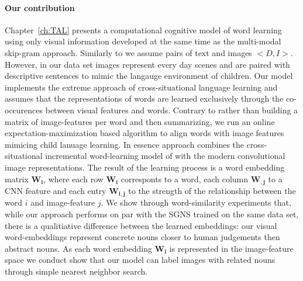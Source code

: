 \paragraph{Our contribution}
Chapter~\ref{ch:TAL} presents a computational cognitive model of word learning using only
visual information developed at the same time as the multi-modal skip-gram approach.
Similarly to \cite{feng2010visual} we assume pairs of text and images
$<D, I>$. However, in our data set images represent every day scenes and are paired with descriptive
sentences to mimic the langauge environment of children.
Our model implements the extreme approach of cross-situational language
learning and assumes that the representations of words are learned exclusively through the co-occurences
between visual features and words. Contrary to \cite{kiela2014learning} rather than building a
matrix of image-features per word and then summarizing, we run an online expectation-maximization based
algorithm to align words with image features mimicing child lanuage learning.
In essence approach combines the cross-situational incremental word-learning model
of \cite{fazly.etal.10csj} with the modern convolutional image representations.
The result of the learning process is a word embedding matrix $\mathbf{W_i}$,
where each row $\mathbf{W_i}$ corresponts to a word, each column $\mathbf{W_{,j}}$
to a CNN feature and each entry $\mathbf{W_{i,j}}$ to the strength
of the relationship between the word $i$ and image-feature $j$.
We show through word-similarity experiments that, while our approach performs on
par with the SGNS trained on the same data set, there is a qualitiative difference between
the learned embeddings: our visual word-embeddings represent concrete nouns closer to human
judgements then abstract nouns. As each word embedding $\mathbf{W_i}$ is represented in the
image-feature space we conduct show that our model can label images with related nouns through
simple nearest neighbor search.

